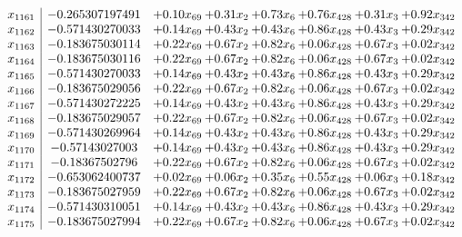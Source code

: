 \documentclass[8pt]{article}
\begin{document}
\[\begin{array}{c| c c@{\hskip 2pt} c@{\hskip 2pt} c@{\hskip 2pt} c@{\hskip 2pt} c@{\hskip 2pt} c@{\hskip 2pt} }
 x_{1161}   &  -0.265307197491 & +  0.10 x_{69} & +  0.31 x_{2} & +  0.73 x_{6} & +  0.76 x_{428} & +  0.31 x_{3} & +  0.92 x_{342}\\
 x_{1162}   &  -0.571430270033 & +  0.14 x_{69} & +  0.43 x_{2} & +  0.43 x_{6} & +  0.86 x_{428} & +  0.43 x_{3} & +  0.29 x_{342}\\
 x_{1163}   &  -0.183675030114 & +  0.22 x_{69} & +  0.67 x_{2} & +  0.82 x_{6} & +  0.06 x_{428} & +  0.67 x_{3} & +  0.02 x_{342}\\
 x_{1164}   &  -0.183675030116 & +  0.22 x_{69} & +  0.67 x_{2} & +  0.82 x_{6} & +  0.06 x_{428} & +  0.67 x_{3} & +  0.02 x_{342}\\
 x_{1165}   &  -0.571430270033 & +  0.14 x_{69} & +  0.43 x_{2} & +  0.43 x_{6} & +  0.86 x_{428} & +  0.43 x_{3} & +  0.29 x_{342}\\
 x_{1166}   &  -0.183675029056 & +  0.22 x_{69} & +  0.67 x_{2} & +  0.82 x_{6} & +  0.06 x_{428} & +  0.67 x_{3} & +  0.02 x_{342}\\
 x_{1167}   &  -0.571430272225 & +  0.14 x_{69} & +  0.43 x_{2} & +  0.43 x_{6} & +  0.86 x_{428} & +  0.43 x_{3} & +  0.29 x_{342}\\
 x_{1168}   &  -0.183675029057 & +  0.22 x_{69} & +  0.67 x_{2} & +  0.82 x_{6} & +  0.06 x_{428} & +  0.67 x_{3} & +  0.02 x_{342}\\
 x_{1169}   &  -0.571430269964 & +  0.14 x_{69} & +  0.43 x_{2} & +  0.43 x_{6} & +  0.86 x_{428} & +  0.43 x_{3} & +  0.29 x_{342}\\
 x_{1170}   &  -0.57143027003 & +  0.14 x_{69} & +  0.43 x_{2} & +  0.43 x_{6} & +  0.86 x_{428} & +  0.43 x_{3} & +  0.29 x_{342}\\
 x_{1171}   &  -0.18367502796 & +  0.22 x_{69} & +  0.67 x_{2} & +  0.82 x_{6} & +  0.06 x_{428} & +  0.67 x_{3} & +  0.02 x_{342}\\
 x_{1172}   &  -0.653062400737 & +  0.02 x_{69} & +  0.06 x_{2} & +  0.35 x_{6} & +  0.55 x_{428} & +  0.06 x_{3} & +  0.18 x_{342}\\
 x_{1173}   &  -0.183675027959 & +  0.22 x_{69} & +  0.67 x_{2} & +  0.82 x_{6} & +  0.06 x_{428} & +  0.67 x_{3} & +  0.02 x_{342}\\
 x_{1174}   &  -0.571430310051 & +  0.14 x_{69} & +  0.43 x_{2} & +  0.43 x_{6} & +  0.86 x_{428} & +  0.43 x_{3} & +  0.29 x_{342}\\
 x_{1175}   &  -0.183675027994 & +  0.22 x_{69} & +  0.67 x_{2} & +  0.82 x_{6} & +  0.06 x_{428} & +  0.67 x_{3} & +  0.02 x_{342}\\

\end{array}\]
\end{document}
